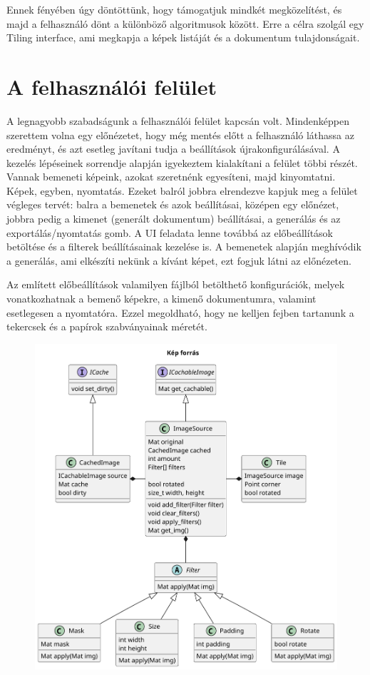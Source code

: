 Ennek fényében úgy döntöttünk, hogy támogatjuk mindkét megközelítést, és majd a felhasználó dönt a különböző algoritmusok között. Erre a célra szolgál egy Tiling interface, ami megkapja a képek listáját és a dokumentum tulajdonságait.

\section{A felhasználói felület}

A legnagyobb szabadságunk a felhasználói felület kapcsán volt. Mindenképpen szerettem volna egy előnézetet, hogy még mentés előtt a felhasználó láthassa az eredményt, és azt esetleg javítani tudja a beállítások újrakonfigurálásával. A kezelés lépéseinek sorrendje alapján igyekeztem kialakítani a felület többi részét. Vannak bemeneti képeink, azokat szeretnénk egyesíteni, majd kinyomtatni. Képek, egyben, nyomtatás. Ezeket balról jobbra elrendezve kapjuk meg a felület végleges tervét: balra a bemenetek és azok beállításai, középen egy előnézet, jobbra pedig a kimenet (generált dokumentum) beállításai, a generálás és az exportálás/nyomtatás gomb. A UI feladata lenne továbbá az előbeállítások betöltése és a filterek beállításainak kezelése is. A bemenetek alapján meghívódik a generálás, ami elkészíti nekünk a kívánt képet, ezt fogjuk látni az előnézeten.

Az említett előbeállítások valamilyen fájlból betölthető konfigurációk, melyek vonatkozhatnak a bemenő képekre, a kimenő dokumentumra, valamint esetlegesen a nyomtatóra. Ezzel megoldható, hogy ne kelljen fejben tartanunk a tekercsek és a papírok szabványainak méretét.


\begin{figure}
    \centering
    \includegraphics[width=15cm]{figures/uml/img_source.pdf}
    \label{fig:ImageSource_uml}
\end{figure}

